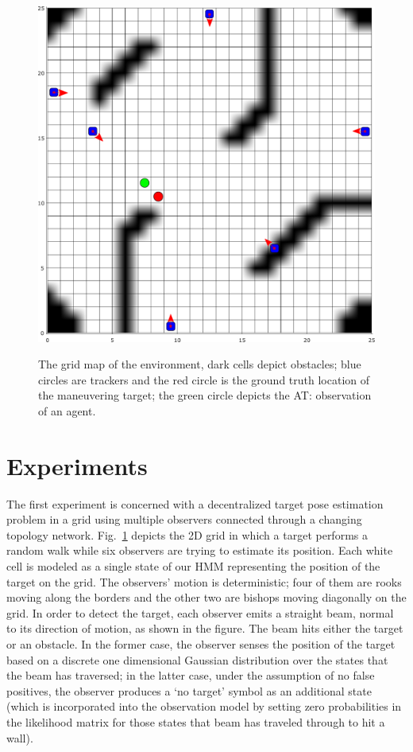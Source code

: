 \documentclass[conference]{IEEEtran}
\theoremstyle{remark}
\newcommand{\axx}[1]{{\color{blue} AT: #1  \ }}  %
\begin{document}
\begin{figure}[t]
	\centering
	{\includegraphics[width=.85\columnwidth]{./figs/exp1_corrected.pdf}}
	\caption{ The grid map of the environment, dark cells depict obstacles; 
	blue circles are trackers and the red circle is the ground truth location 
	of the maneuvering target; the green circle depicts the \axx{observation of 
	an agent.}}
	\label{fig:exp1}
\end{figure}

\section{Experiments} \label{sec:experiments}
The first experiment is concerned with a decentralized target pose estimation 
problem in a grid using multiple observers  connected through a changing  
topology network. Fig.~\ref{fig:exp1} depicts the 2D grid in which a target 
performs a random walk while six observers are trying to estimate its position. 
Each white cell is modeled as a single state of our HMM representing the 
position of the target on the grid. The observers' motion is deterministic; 
four of them are rooks moving along the borders and the other two are bishops 
moving diagonally on the grid. In order to detect the target, each observer 
emits a straight beam, normal to its direction of motion, as shown in the 
figure. The beam hits either the target or an obstacle. In the former case, the 
observer senses the position of the target 
based on a discrete one dimensional Gaussian distribution over the states that 
the beam has traversed; in the latter case, under the assumption of no false 
positives, the observer produces a `no target' symbol as an additional 
state (which is incorporated into the observation model by setting zero 
probabilities in 
the likelihood matrix for those states that beam has traveled through to hit 
a wall). 
\end{document}
